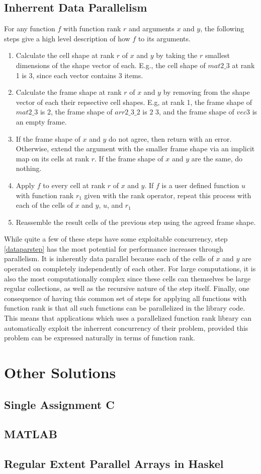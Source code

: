 \subsection{Inherrent Data Parallelism}
For any function $f$ with function rank $r$ and arguments $x$ and $y$, 
the following steps give a high level description of how $f$ to its arguments.\cite{rankanduni}
\begin{enumerate}
	\item Calculate the cell shape at rank $r$ of $x$ and $y$ 
		by taking the $r$ smallest dimensions of the shape vector of each.
		E.g., the cell shape of $mat2\_3$ at rank 1 is 3, since each vector contains 3 items.
	\item Calculate the frame shape at rank $r$ of $x$ and $y$ 
		by removing from the shape vector of each their repsective cell shapes.
		E.g, at rank 1, the frame shape of $mat2\_3$ is $2$,
		the frame shape of $arr2\_3\_2$ is $2$ $3$, 
		and the frame shape of $vec3$ is an empty frame.
	\item If the frame shape of $x$ and $y$ do not agree, then return with an error.
		Otherwise, extend the argument with the smaller frame shape via an implicit map on its cells at rank $r$.
		If the frame shape of $x$ and $y$ are the same, do nothing.
	\item \label{dataparstep}Apply $f$ to every cell at rank $r$ of $x$ and $y$.
		If $f$ is a user defined function $u$ with function rank $r_1$ given with the rank operator, 
		repeat this process with each of the cells of $x$ and $y$, $u$, and $r_1$
	\item Reassemble the result cells of the previous step using the agreed frame shape.
\end{enumerate}

While quite a few of these steps have some exploitable concurrency, 
step \ref{dataparstep} has the most potential for performance increases through parallelism.
It is inherently data parallel because each of the cells of $x$ and $y$ are operated on completely independently of each other.
For large computations, it is also the most computationally complex 
since these cells can themselves be large regular collections, 
as well as the recursive nature of the step itself.
Finally, one consequence of having this common set of steps for applying all functions with function rank is
that all such functions can be parallelized in the library code.
This means that applications which uses a parallelized function rank library 
can automatically exploit the inherrent concurrency of their problem, 
provided this problem can be expressed naturally in terms of function rank.

\section{Other Solutions}
\subsection{Single Assignment C}

\subsection{MATLAB}

\subsection{Regular Extent Parallel Arrays in Haskel}
